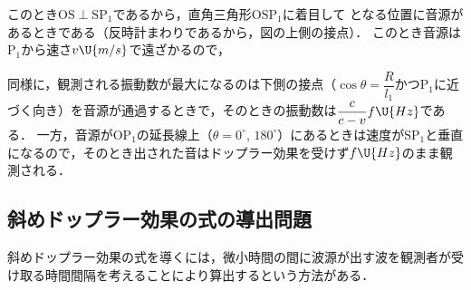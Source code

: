 \begin{reidaiunit}
\begin{kaitou}
\hspace{1zw}このとき$\mathrm{OS}\perp\mathrm{SP_1}$であるから，直角三角形$\mathrm{OSP_1}$に着目して
となる位置に音源があるときである（反時計まわりであるから，図の上側の接点）．
このとき音源は$\mathrm{P_1}$から速さ$v\U{m/s}$で遠ざかるので，
\end{kaitou}
\begin{chuu}
同様に，観測される振動数が最大になるのは下側の接点（$\cos\theta=\dfrac{R}{l_1}$かつ$\mathrm{P_1}$に近づく向き）を音源が通過するときで，そのときの振動数は$\dfrac{c}{c-v}f\U{Hz}$である．
一方，音源が$\mathrm{OP_1}$の延長線上（$\theta=0^\circ$, $180^\circ$）にあるときは速度が$\mathrm{SP_1}$と垂直になるので，そのとき出された音はドップラー効果を受けず$f\U{Hz}$のまま観測される．
\end{chuu}
\end{reidaiunit}

\bsNeed{46mm}
\subsection{斜めドップラー効果の式の導出問題}

斜めドップラー効果の式を導くには，微小時間の間に波源が出す波を観測者が受け取る時間間隔を考えることにより算出するという方法がある．

